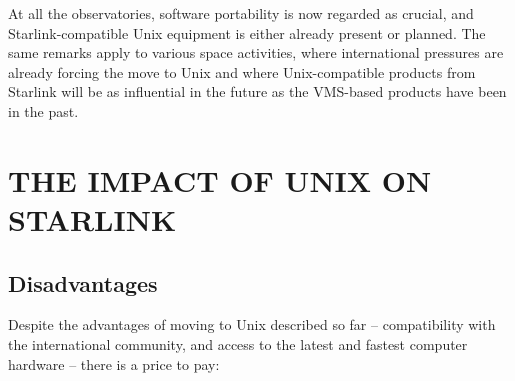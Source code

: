 At all the observatories, software portability is now regarded as
crucial, and Starlink-compatible Unix equipment is either already
present or planned.  The same remarks apply to various space activities,
where international pressures are already forcing the move to Unix and
where Unix-compatible products from Starlink will be as influential in
the future as the VMS-based products have been in the past.

\section{THE IMPACT OF UNIX ON STARLINK}
\subsection{Disadvantages}
Despite the advantages of moving to Unix described so far --
compatibility with the international community, and access to the latest
and fastest computer hardware -- there is a price to pay:
